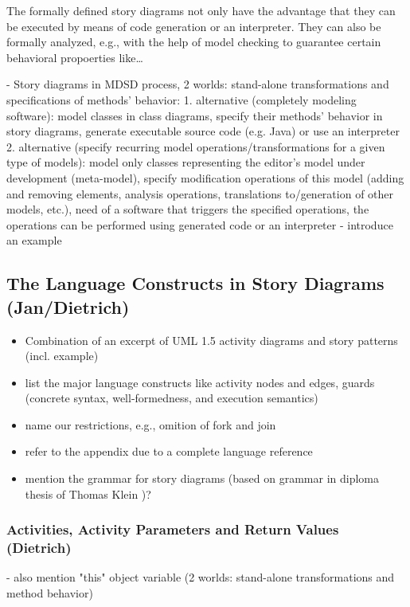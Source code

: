
The formally defined story diagrams not only have the advantage that they can be executed by means of code generation or an interpreter.
They can also be formally analyzed, e.g., with the help of model checking to guarantee certain behavioral propoerties like\ldots



- Story diagrams in MDSD process, 2 worlds: stand-alone transformations and specifications of methods' behavior:
  1. alternative (completely modeling software): model classes in class diagrams, specify their methods' behavior in story diagrams, generate executable source code (e.g. Java) or use an interpreter
  2. alternative (specify recurring model operations/transformations for a given type of models): model only classes representing the editor's model under development (meta-model), specify modification operations of this model (adding and removing elements, analysis operations, translations to/generation of other models, etc.), need of a software that triggers the specified operations, the operations can be performed using generated code or an interpreter
- introduce an example


\subsection{The Language Constructs in Story Diagrams (Jan/Dietrich)}\label{sec:StoryDiagrams:composition}

\begin{itemize}
  \item Combination of an excerpt of UML 1.5 activity diagrams and story patterns (incl. example)
  \item list the major language constructs like activity nodes and edges, guards (concrete syntax, well-formedness, and execution semantics)
  \item name our restrictions, e.g., omition of fork and join
  \item refer to the appendix due to a complete language reference
  \item mention the grammar for story diagrams (based on grammar in diploma thesis of Thomas Klein \cite{Kle99})?
\end{itemize}


\subsubsection{Activities, Activity Parameters and Return Values (Dietrich)}
- also mention "this" object variable (2 worlds: stand-alone transformations and method behavior)

